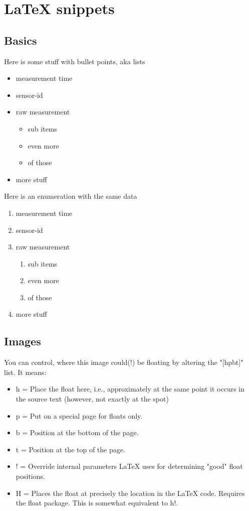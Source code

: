 \chapter{LaTeX snippets}
\label{s:latexsnippets}


\section{Basics}

Here is some stuff with bullet points, aka lists
\begin{itemize}
	\item measurement time
	\item sensor-id
	\item raw measurement
	\begin{itemize}
		\item sub items 
		\item even more
		\item of those
	\end{itemize}
	\item more stuff
\end{itemize}


Here is an enumeration with the same data
\begin{enumerate}
	\item measurement time
	\item sensor-id
	\item raw measurement
	\begin{enumerate}
		\item sub items 
		\item even more
		\item of those
	\end{enumerate}
	\item more stuff
\end{enumerate}





\section{Images}

You can control, where this image could(!) be floating by altering the  "[hpbt]" list. It means:
\begin{itemize}
	\item h = Place the float here, i.e., approximately at the same point it occurs in the source text (however, not exactly at the spot)
	\item p = Put on a special page for floats only.
	\item b = Position at the bottom of the page.
	\item t = Position at the top of the page.
	\item ! = Override internal parameters LaTeX uses for determining "good" float positions.
	\item H = Places the float at precisely the location in the LaTeX code. Requires the float package. This is somewhat equivalent to h!.
\end{itemize}



